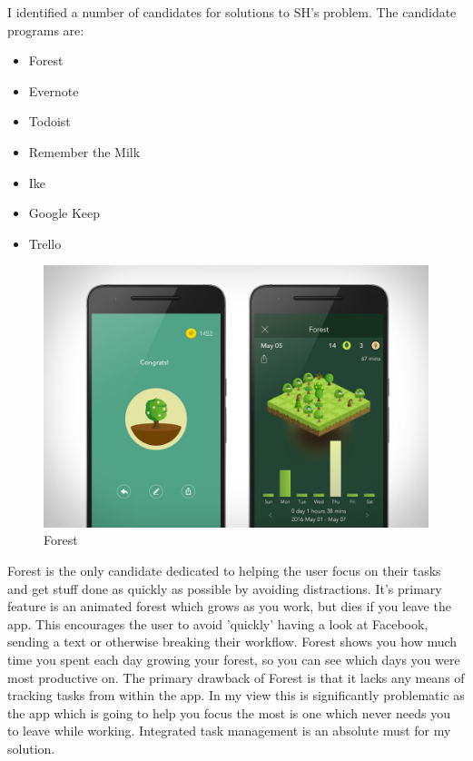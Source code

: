 \documentclass[]{article}
\begin{document}
I identified a number of candidates for solutions to SH's problem. The
candidate programs are:

\begin{itemize}
\item
  Forest
\item
  Evernote
\item
  Todoist
\item
  Remember the Milk
\item
  Ike
\item
  Google Keep
\item
  Trello
\end{itemize}

\begin{figure}
\hypertarget{fig:forest1}{%
\centering
\includegraphics{./tex2pdf.-ae8b3c0afe160db8/a3e4542973b17b9d6b65c99952603f0d741f1d42.jpg}
\caption{Forest{}}\label{fig:forest1}
}
\end{figure}

Forest is the only candidate dedicated to helping the user focus on
their tasks and get stuff done as quickly as possible by avoiding
distractions. It's primary feature is an animated forest which grows as
you work, but dies if you leave the app. This encourages the user to
avoid 'quickly' having a look at Facebook, sending a text or otherwise
breaking their workflow. Forest shows you how much time you spent each
day growing your forest, so you can see which days you were most
productive on. The primary drawback of Forest is that it lacks any means
of tracking tasks from within the app. In my view this is significantly
problematic as the app which is going to help you focus the most is one
which never needs you to leave while working. Integrated task management
is an absolute must for my solution.
\end{document}
